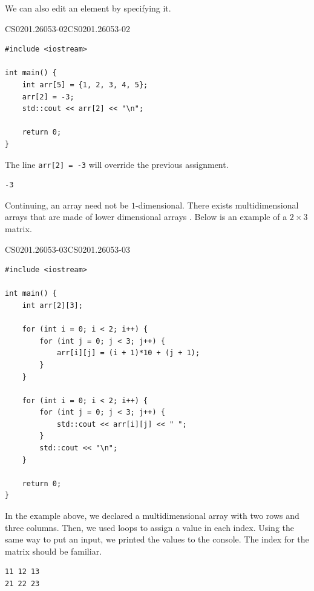 \documentclass[../../main.tex]{subfiles}
\begin{document}
We can also edit an element by specifying it.

\begin{cppbox}{CS0201.26053-02}{CS0201.26053-02}
\begin{lstlisting}[style=cppstyle]
#include <iostream>

int main() {
    int arr[5] = {1, 2, 3, 4, 5};
    arr[2] = -3;
    std::cout << arr[2] << "\n";

    return 0;
}
\end{lstlisting}
\end{cppbox}

The line \verb|arr[2] = -3| will override the previous assignment.

\begin{outputbox}
\begin{lstlisting}[style=basic]
-3
\end{lstlisting}
\end{outputbox}

Continuing, an array need not be $1$-dimensional. There exists
multidimensional arrays that are made of lower dimensional
arrays \cite{CS02-6}. Below is an example of a $2 \times 3$
matrix.

\begin{cppbox}{CS0201.26053-03}{CS0201.26053-03}
\begin{lstlisting}[style=cppstyle]
#include <iostream>

int main() {
    int arr[2][3];

    for (int i = 0; i < 2; i++) {
        for (int j = 0; j < 3; j++) {
            arr[i][j] = (i + 1)*10 + (j + 1);
        }
    }

    for (int i = 0; i < 2; i++) {
        for (int j = 0; j < 3; j++) {
            std::cout << arr[i][j] << " ";
        }
        std::cout << "\n";
    }

    return 0;
}
\end{lstlisting}
\end{cppbox}

In the example above, we declared a multidimensional array with
two rows and three columns. Then, we used loops to assign a value
in each index. Using the same way to put an input, we printed the
values to the console. The index for the matrix should be familiar.

\begin{outputbox}
\begin{lstlisting}[style=basic]
11 12 13
21 22 23
\end{lstlisting}
\end{outputbox}
\end{document}
